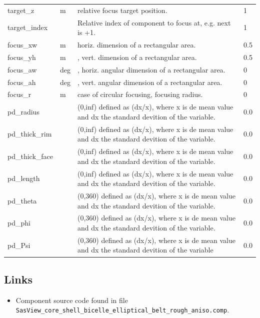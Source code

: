 \begin{longtable}{p{}p{}p{}p{}}
target\_z & m & relative focus target position. & 1 \\
target\_index &   & Relative index of component to focus at, e.g. next is +1. & 1 \\
focus\_xw & m & horiz. dimension of a rectangular area. & 0.5 \\
focus\_yh & m & , vert. dimension of a rectangular area. & 0.5 \\
focus\_aw & deg & , horiz. angular dimension of a rectangular area. & 0 \\
focus\_ah & deg & , vert. angular dimension of a rectangular area. & 0 \\
focus\_r & m & case of circular focusing, focusing radius. & 0 \\
pd\_radius &  & (0,inf) defined as (dx/x), where x is de mean value and dx the standard devition of the variable. & 0.0 \\
pd\_thick\_rim &  & (0,inf) defined as (dx/x), where x is de mean value and dx the standard devition of the variable. & 0.0 \\
pd\_thick\_face &  & (0,inf) defined as (dx/x), where x is de mean value and dx the standard devition of the variable. & 0.0 \\
pd\_length &  & (0,inf) defined as (dx/x), where x is de mean value and dx the standard devition of the variable. & 0.0 \\
pd\_theta &  & (0,360) defined as (dx/x), where x is de mean value and dx the standard devition of the variable. & 0.0 \\
pd\_phi &  & (0,360) defined as (dx/x), where x is de mean value and dx the standard devition of the variable. & 0.0 \\
pd\_Psi &  & (0,360) defined as (dx/x), where x is de mean value and dx the standard devition of the variable & 0.0 \\
\bottomrule
\end{longtable}

\subsection*{Links}
\begin{itemize}
  \item Component source code found in file \texttt{SasView\_core\_shell\_bicelle\_elliptical\_belt\_rough\_aniso.comp}.
\end{itemize}
